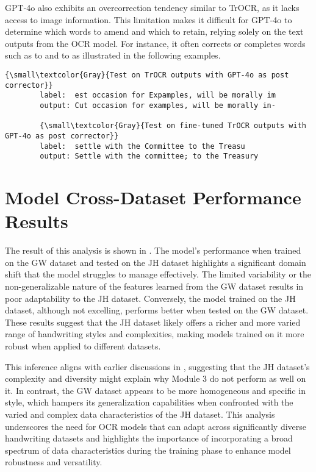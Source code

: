 GPT-4o also exhibits an overcorrection tendency similar to TrOCR, as it lacks access to image information. This limitation makes it difficult for GPT-4o to determine which words to amend and which to retain, relying solely on the text outputs from the OCR model. For instance, it often corrects or completes words such as  to  and  to  as illustrated in the following examples.

\begin{center}
    \begin{minipage}{1.0\textwidth}
    \begin{Verbatim}[commandchars=\\\{\}]
        {\small\textcolor{Gray}{Test on TrOCR outputs with GPT-4o as post corrector}}
        label:  est occasion for Expamples, will be morally im
        output: Cut occasion for examples, will be morally in- 

        {\small\textcolor{Gray}{Test on fine-tuned TrOCR outputs with GPT-4o as post corrector}}
        label:  settle with the Committee to the Treasu
        output: Settle with the committee; to the Treasury
    \end{Verbatim}
    \end{minipage}
\end{center}

\section{Model Cross-Dataset Performance Results}
\label{sec:5_model_adaptability_results}
The result of this analysis is shown in . The model's performance when trained on the GW dataset and tested on the JH dataset highlights a significant domain shift that the model struggles to manage effectively. The limited variability or the non-generalizable nature of the features learned from the GW dataset results in poor adaptability to the JH dataset. Conversely, the model trained on the JH dataset, although not excelling, performs better when tested on the GW dataset. These results suggest that the JH dataset likely offers a richer and more varied range of handwriting styles and complexities, making models trained on it more robust when applied to different datasets.

This inference aligns with earlier discussions in , suggesting that the JH dataset's complexity and diversity might explain why Module 3 do not perform as well on it. In contrast, the GW dataset appears to be more homogeneous and specific in style, which hampers its generalization capabilities when confronted with the varied and complex data characteristics of the JH dataset. This analysis underscores the need for OCR models that can adapt across significantly diverse handwriting datasets and highlights the importance of incorporating a broad spectrum of data characteristics during the training phase to enhance model robustness and versatility.

